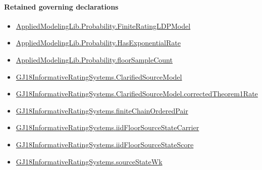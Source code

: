 \documentclass[10pt]{article}
\begin{document}
\paragraph{Retained governing declarations}
\begin{itemize}\raggedright
\item \hyperlink{governing-declaration-765e92a42a7a9947}{Applied\allowbreak{}Modeling\allowbreak{}Lib.\allowbreak{}Probability.\allowbreak{}Finite\allowbreak{}Rating\allowbreak{}LDP\allowbreak{}Model}
\item \hyperlink{governing-declaration-e023a17eef63c747}{Applied\allowbreak{}Modeling\allowbreak{}Lib.\allowbreak{}Probability.\allowbreak{}Has\allowbreak{}Exponential\allowbreak{}Rate}
\item \hyperlink{library-prerequisite-b01059f5e405e09c}{Applied\allowbreak{}Modeling\allowbreak{}Lib.\allowbreak{}Probability.\allowbreak{}floor\allowbreak{}Sample\allowbreak{}Count}
\item \hyperlink{paper-prerequisite-1ee67f5518d0a925}{GJ18\allowbreak{}Informative\allowbreak{}Rating\allowbreak{}Systems.\allowbreak{}Clarified\allowbreak{}Source\allowbreak{}Model}
\item \hyperlink{governing-declaration-e0bd1b6ffba52d79}{GJ18\allowbreak{}Informative\allowbreak{}Rating\allowbreak{}Systems.\allowbreak{}Clarified\allowbreak{}Source\allowbreak{}Model.\allowbreak{}corrected\allowbreak{}Theorem1\allowbreak{}Rate}
\item \hyperlink{governing-declaration-490763321205956c}{GJ18\allowbreak{}Informative\allowbreak{}Rating\allowbreak{}Systems.\allowbreak{}finite\allowbreak{}Chain\allowbreak{}Ordered\allowbreak{}Pair}
\item \hyperlink{governing-declaration-70ff3320c885dbc0}{GJ18\allowbreak{}Informative\allowbreak{}Rating\allowbreak{}Systems.\allowbreak{}iid\allowbreak{}Floor\allowbreak{}Source\allowbreak{}State\allowbreak{}Carrier}
\item \hyperlink{governing-declaration-a4b741138dce5934}{GJ18\allowbreak{}Informative\allowbreak{}Rating\allowbreak{}Systems.\allowbreak{}iid\allowbreak{}Floor\allowbreak{}Source\allowbreak{}State\allowbreak{}Score}
\item \hyperlink{paper-prerequisite-6810b88015106e2c}{GJ18\allowbreak{}Informative\allowbreak{}Rating\allowbreak{}Systems.\allowbreak{}source\allowbreak{}State\allowbreak{}Wk}
\end{itemize}
\end{document}
